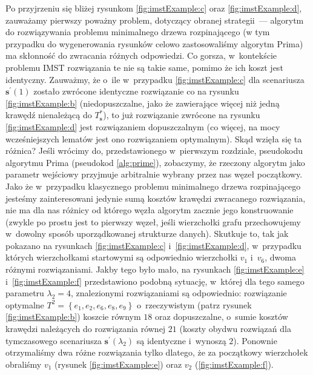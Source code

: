 Po przyjrzeniu się bliżej rysunkom \ref{fig:imstExample:c} oraz \ref{fig:imstExample:d}, zauważamy pierwszy poważny problem, dotyczący obranej strategii~--- algorytm do rozwiązywania problemu minimalnego drzewa rozpinającego (w tym przypadku do wygenerowania rysunków celowo zastosowaliśmy algorytm Prima) ma skłonność do zwracania różnych odpowiedzi.
Co gorsza, w~kontekście problemu \textsc{IMST} rozwiązania te nie są takie same, pomimo że ich koszt jest identyczny.
Zauważmy, że o~ile w~przypadku \ref{fig:imstExample:c} dla scenariusza $\textbf{s}^{\prime} \left( 1 \right)$ zostało zwrócone identyczne rozwiązanie co na rysunku \ref{fig:imstExample:b} (niedopuszczalne, jako że zawierające więcej niż jedną krawędź nienależącą do $T^{\ast}_{\textbf{s}}$), to już rozwiązanie zwrócone na rysunku \ref{fig:imstExample:d} jest rozwiązaniem dopuszczalnym (co więcej, na mocy wcześniejszych lematów jest ono rozwiązaniem optymalnym).
Skąd wzięła się ta różnica?
Jeśli wrócimy do, przedstawionego w~pierwszym rozdziale, pseudokodu algorytmu Prima (pseudokod \ref{alg:prime}), zobaczymy, że rzeczony algorytm jako parametr wejściowy przyjmuje arbitralnie wybrany przez nas węzeł początkowy.
Jako że w~przypadku klasycznego problemu minimalnego drzewa rozpinającego jesteśmy zainteresowani jedynie sumą kosztów krawędzi zwracanego rozwiązania, nie ma dla nas różnicy od którego węzła algorytm zacznie jego konstruowanie (zwykle po prostu jest to pierwszy węzeł, jeśli wierzchołki grafu przechowujemy w~dowolny sposób uporządkowanej strukturze danych).
Skutkuje to, tak jak pokazano na rysunkach \ref{fig:imstExample:c} i~\ref{fig:imstExample:d}, w~przypadku których wierzchołkami startowymi są odpowiednio wierzchołki $v_{1}$ i~$v_{6}$, dwoma różnymi rozwiązaniami.
Jakby tego było mało, na rysunkach \ref{fig:imstExample:e} i~\ref{fig:imstExample:f} przedstawiono podobną sytuację, w~której dla tego samego parametru $\lambda_{2} = 4$, znalezionymi rozwiązaniami są odpowiednio: rozwiązanie optymalne $T^{2} = \left\{ e_{1}, e_{2}, e_{6}, e_{8}, e_{9} \right\}$ o~rzeczywistym (patrz rysunek \ref{fig:imstExample:b}) koszcie równym $18$ oraz dopuszczalne, o~sumie kosztów krawędzi należących do rozwiązania równej $21$ (koszty obydwu rozwiązań dla tymczasowego scenariusza $\textbf{s}^{\prime} \left( \lambda_{2} \right)$ są identyczne i~wynoszą $2$).
Ponownie otrzymaliśmy dwa różne rozwiązania tylko dlatego, że za początkowy wierzchołek obraliśmy $v_{1}$ (rysunek \ref{fig:imstExample:e}) oraz $v_{2}$ (\ref{fig:imstExample:f}).

